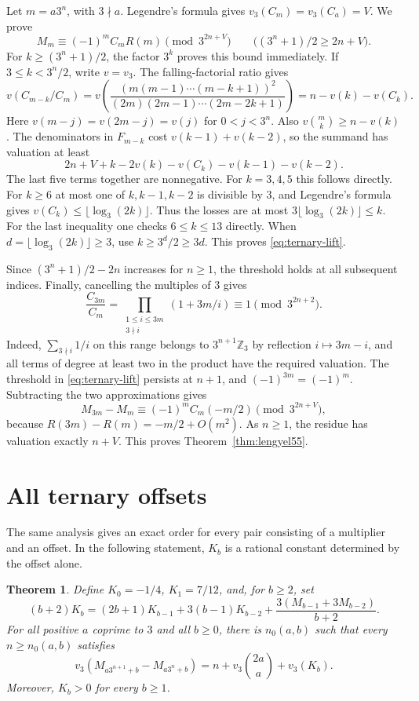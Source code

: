 \documentclass[11pt,a4paper]{article}
\newtheorem{theorem}{Theorem}[section]
\begin{document}
Let $m=a3^n$, with $3\nmid a$. Legendre's formula gives
$v_3(C_m)=v_3(C_a)=V$. We prove
\begin{equation}\label{eq:ternary-lift}
 M_m\equiv(-1)^m C_m R(m)\pmod{3^{2n+V}}
 \qquad\bigl((3^n+1)/2\ge2n+V\bigr).
\end{equation}
For $k\ge(3^n+1)/2$, the factor $3^k$ proves this bound immediately.
If $3\le k<3^n/2$, write $v=v_3$. The falling-factorial ratio gives
\[
 v(C_{m-k}/C_m)
 =v\!\left(\frac{(m(m-1)\cdots(m-k+1))^2}
 {(2m)(2m-1)\cdots(2m-2k+1)}\right)
 =n-v(k)-v(C_k).
\]
Here $v(m-j)=v(2m-j)=v(j)$ for $0<j<3^n$.
Also $v\binom{m}{k}\ge n-v(k)$.
The denominators in $F_{m-k}$ cost $v(k-1)+v(k-2)$,
so the summand has valuation at least
\[
 2n+V+k-2v(k)-v(C_k)-v(k-1)-v(k-2).
\]
The last five terms together are nonnegative. For $k=3,4,5$ this
follows directly. For $k\ge6$ at most one of $k,k-1,k-2$ is
divisible by $3$, and Legendre's formula gives
$v(C_k)\le\lfloor\log_3(2k)\rfloor$. Thus the losses are
at most $3\lfloor\log_3(2k)\rfloor\le k$. For the last inequality
one checks $6\le k\le13$ directly. When $d=\lfloor\log_3(2k)\rfloor
\ge3$, use $k\ge3^d/2\ge3d$.
This proves \eqref{eq:ternary-lift}.

Since $(3^n+1)/2-2n$ increases for $n\ge1$, the threshold holds at all subsequent indices. Finally, cancelling the multiples of $3$ gives
\[
 \frac{C_{3m}}{C_m}
 =\prod_{\substack{1\le i\le3m\\3\nmid i}}(1+3m/i)
 \equiv1\pmod{3^{2n+2}}.
\]
Indeed, $\sum_{3\nmid i}1/i$ on this range belongs to
$3^{n+1}\mathbb Z_3$ by reflection $i\mapsto3m-i$,
and all terms of degree at least two in the product have the
required valuation. The threshold in \eqref{eq:ternary-lift}
persists at $n+1$, and $(-1)^{3m}=(-1)^m$.
Subtracting the two approximations gives
\[
 M_{3m}-M_m
 \equiv(-1)^m C_m(-m/2)\pmod{3^{2n+V}},
\]
because $R(3m)-R(m)=-m/2+O(m^2)$.
As $n\ge1$, the residue has valuation exactly $n+V$.
This proves Theorem~\ref{thm:lengyel55}.
\section{All ternary offsets}

The same analysis gives an exact order for every pair consisting of a
multiplier and an offset. In the following statement, $K_b$ is a
rational constant determined by the offset alone.

\begin{theorem}\label{thm:all-3-shifts}
Define $K_0=-1/4$, $K_1=7/12$, and, for $b\ge2$, set
\[
 (b+2)K_b=(2b+1)K_{b-1}+3(b-1)K_{b-2}
             +\frac{3(M_{b-1}+3M_{b-2})}{b+2}.
\]
For all positive $a$ coprime to $3$ and all $b\ge0$, there is
$n_0(a,b)$ such that every $n\ge n_0(a,b)$ satisfies
\[
 v_3(M_{a3^{n+1}+b}-M_{a3^n+b})
    =n+v_3\binom{2a}{a}+v_3(K_b).
\]
Moreover, $K_b>0$ for every $b\ge1$.
\end{theorem}
\end{document}
